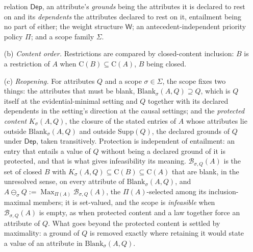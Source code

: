 \begin{definition}
\begin{enumerate}
relation $\mathsf{Dep}$, an attribute's \emph{grounds} being the attributes it is declared to rest on and its \emph{dependents} the attributes declared to rest on it, entailment being no part of either; the weight structure $\mathsf{W}$; an antecedent-independent priority policy $\Pi$; and a scope family $\Sigma$.
\item[(b)] \emph{Content order.} Restrictions are compared by closed-content inclusion: $B$ is a restriction of $A$ when $\mathrm{C}(B) \subseteq \mathrm{C}(A)$, $B$ being closed.
\item[(c)] \emph{Reopening.} For attributes $Q$ and a scope $\sigma \in \Sigma$, the scope fixes two things: the attributes that must be blank, $\mathrm{Blank}_\sigma(A, Q) \supseteq Q$, which is $Q$ itself at the evidential-minimal setting and $Q$ together with its declared dependents in the setting's direction at the causal settings; and the \emph{protected content} $K_\sigma(A, Q)$, the closure of the stated entries of $A$ whose attributes lie outside $\mathrm{Blank}_\sigma(A, Q)$ and outside $\mathrm{Supp}(Q)$, the declared grounds of $Q$ under $\mathsf{Dep}$, taken transitively. Protection is independent of entailment: an entry that entails a value of $Q$ without being a declared ground of it is protected, and that is what gives infeasibility its meaning. $\mathcal{B}_{\sigma,Q}(A)$ is the set of closed $B$ with $K_\sigma(A, Q) \subseteq \mathrm{C}(B) \subseteq \mathrm{C}(A)$ that are blank, in the unresolved sense, on every attribute of $\mathrm{Blank}_\sigma(A, Q)$, and $A \ominus_\sigma Q := \operatorname{Max}_{\Pi(A)} \mathcal{B}_{\sigma,Q}(A)$, the $\Pi(A)$-selected among its inclusion-maximal members; it is set-valued, and the scope is \emph{infeasible} when $\mathcal{B}_{\sigma,Q}(A)$ is empty, as when protected content and a law together force an attribute of $Q$. What goes beyond the protected content is settled by maximality: a ground of $Q$ is removed exactly where retaining it would state a value of an attribute in $\mathrm{Blank}_\sigma(A, Q)$.

\end{enumerate}
\end{definition}
